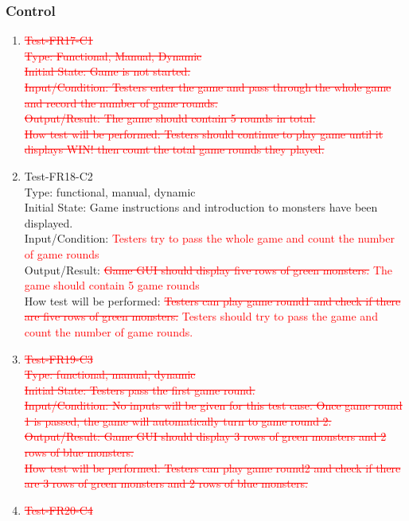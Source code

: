 \documentclass[12pt]{article}
\begin{document}
\subsubsection{Control}
\begin{enumerate}[1.]
\item \textcolor{red}{\st{Test-FR17-C1\\
Type: Functional, Manual, Dynamic\\
Initial State: Game is not started.\\
Input/Condition: Testers enter the game and pass through the whole game and record the number of game rounds.\\
Output/Result: The game should contain 5 rounds in total.\\
How test will be performed: Testers should continue to play game until it displays WIN! then count the total game rounds they played.}}
\newpage
\item Test-FR18-C2\\
Type: functional, manual, dynamic\\
Initial State: Game instructions and introduction to 
monsters have been displayed.\\
Input/Condition: \textcolor{red}{Testers try to pass the whole game and 
count the number of game rounds}\\
Output/Result: \textcolor{red}{\st{Game GUI should display five rows of green monsters.} The game
should contain 5 game rounds}\\
How test will be performed: \textcolor{red}{\st{Testers can play game round1
and check if there are five rows of green monsters.} Testers should try to pass
the game and count the number of game rounds.}
\item \textcolor{red}{\st{Test-FR19-C3\\
Type: functional, manual, dynamic\\
Initial State: Testers pass the first game round.\\
Input/Condition: No inputs will be given for this test 
case. Once game round 1 is passed, the game will
automatically turn to game round 2.\\
Output/Result: Game GUI should display 3 rows of green monsters and 2 rows of blue monsters.\\
How test will be performed: Testers can play game round2
and check if there are 3 rows of green monsters and 2
rows of blue monsters.}}
\item \textcolor{red}{\st{Test-FR20-C4\\
}}
\end{enumerate}
\end{document}
